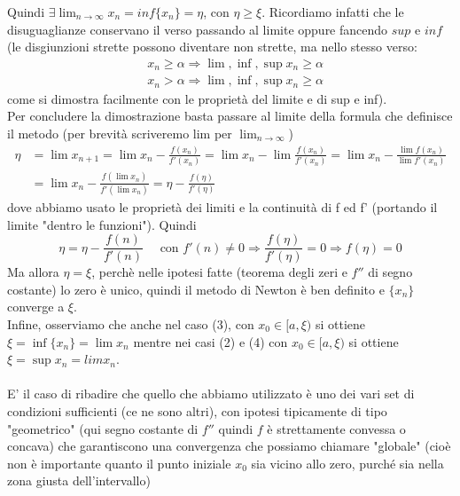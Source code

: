 \documentclass[12pt]{article}
\begin{document}
Quindi $ \exists \lim_{n \to \infty} x_n = inf\{x_n\} = \eta $, con $\eta \geq \xi$. Ricordiamo infatti che le disuguaglianze conservano il verso passando al limite oppure fancendo $sup$ e $inf$ (le disgiunzioni strette possono diventare non strette, ma nello stesso verso:
\begin{equation*}
\begin{split}
	& x_n \geq \alpha \Rightarrow \lim, \inf, \sup x_n \geq \alpha \\ &
	x_n > \alpha \Rightarrow \lim, \inf, \sup x_n \geq \alpha
\end{split}
\end{equation*}
come si dimostra facilmente con le proprietà del limite e di sup e inf).\\
Per concludere la dimostrazione basta passare al limite della formula che definisce il metodo (per brevità scriveremo lim per $ \lim_{n \to \infty} $)
\begin{equation*}
\begin{split}
	\eta & = \lim x_{n+1} = \lim x_n - \frac{f(x_n)}{f'(x_n)}
	= \lim x_n - \lim\frac{f(x_n)}{f'(x_n)} 
	= \lim x_n - \frac{\lim f(x_n)}{\lim f'(x_n)} \\ &
	= \lim x_n - \frac{f(\lim x_n)}{f'(\lim x_n)} 
	= \eta - \frac{f(\eta)}{f'(\eta)}
\end{split}
\end{equation*}
dove abbiamo usato le proprietà dei limiti e la continuità di f ed f' (portando il limite "dentro le funzioni"). Quindi 
\begin{equation*}
	\eta=\eta-\frac{f(n)}{f'(n)} \quad \text{ con } f'(n) \neq 0 \Rightarrow \frac{f(\eta)}{f'(\eta)} = 0 \Rightarrow f(\eta)=0
\end{equation*}
Ma allora $\eta=\xi$, perchè nelle ipotesi fatte (teorema degli zeri e $f''$ di segno costante) lo zero è unico, quindi il metodo di Newton è ben definito e $\{x_n\}$ converge a $\xi$.\\
Infine, osserviamo che anche nel caso (3), con $x_0 \in [a,\xi)$ si ottiene $\xi= \inf\{x_n\}=\lim x_n$ mentre nei casi (2) e (4) con $x_0 \in [a,\xi)$ si ottiene $\xi= \sup x_n=lim x_n.$ \\\\
E' il caso di ribadire che quello che abbiamo utilizzato è uno dei vari set di condizioni sufficienti (ce ne sono altri), con ipotesi tipicamente di tipo "geometrico" (qui segno costante di $f''$ quindi $f$ è strettamente convessa o concava) che garantiscono una convergenza che possiamo chiamare "globale" (cioè non è importante quanto il punto iniziale $x_0$ sia vicino allo zero, purché sia nella zona giusta dell'intervallo)\\
\end{document}
